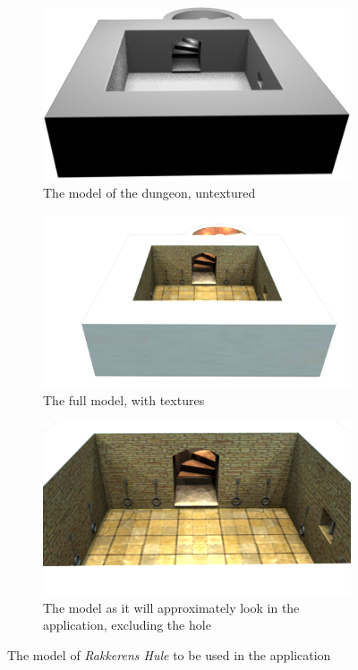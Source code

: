 \begin{figure}
    \centering
        \begin{subfigure}[h!]{0.7\textwidth}
    	\centering
        \includegraphics[width=\textwidth]{figures/model.png}
        \caption{The model of the dungeon, untextured}\label{fig:model}
    \end{subfigure}
    \begin{subfigure}[h!]{0.7\textwidth}
    	\centering
        \includegraphics[width=\textwidth]{figures/model_total.png}
        \caption{The full model, with textures}\label{fig:total}
    \end{subfigure}
    \begin{subfigure}[h!]{0.7\textwidth}
    	\centering
        \includegraphics[width=\textwidth]{figures/model_long.png}
        \caption{The model as it will approximately look in the application, excluding the hole}\label{fig:long}
    \end{subfigure}
    \caption{The model of \textit{Rakkerens Hule} to be used in the application}
\end{figure}


